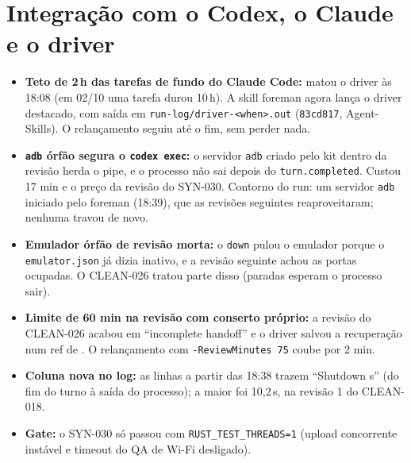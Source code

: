 \documentclass[11pt,a4paper]{article}
\begin{document}
\section{Integração com o Codex, o Claude e o driver}
\begin{itemize}
  \item \textbf{Teto de 2\,h das tarefas de fundo do Claude Code:} matou o
        driver às 18:08 (em 02/10 uma tarefa durou 10\,h). A skill foreman
        agora lança o driver destacado, com saída em
        \texttt{run-log/driver-<when>.out} (\texttt{83cd817}, Agent-Skills). O
        relançamento seguiu até o fim, sem perder nada.
  \item \textbf{\texttt{adb} órfão segura o \texttt{codex exec}:} o servidor
        \texttt{adb} criado pelo kit dentro da revisão herda o pipe, e o processo
        não sai depois do \texttt{turn.completed}. Custou 17 min e o preço da
        revisão do SYN-030. Contorno do run: um servidor \texttt{adb} iniciado
        pelo foreman (18:39), que as revisões seguintes reaproveitaram; nenhuma
        travou de novo.
  \item \textbf{Emulador órfão de revisão morta:} o \texttt{down} pulou o
        emulador porque o \texttt{emulator.json} já dizia inativo, e a revisão
        seguinte achou as portas ocupadas. O CLEAN-026 tratou parte disso
        (paradas esperam o processo sair).
  \item \textbf{Limite de 60 min na revisão com conserto próprio:} a revisão
        do CLEAN-026 acabou em ``incomplete handoff'' e o driver salvou a
        recuperação num ref de . O
        relançamento com \texttt{-ReviewMinutes 75} coube por 2 min.
  \item \textbf{Coluna nova no log:} as linhas a partir das 18:38 trazem
        ``Shutdown s'' (do fim do turno à saída do processo); a maior foi
        10,2\,s, na revisão 1 do CLEAN-018.
  \item \textbf{Gate:} o SYN-030 só passou com \texttt{RUST\_TEST\_THREADS=1}
        (upload concorrente instável e timeout do QA de Wi-Fi desligado).
\end{itemize}
\end{document}
